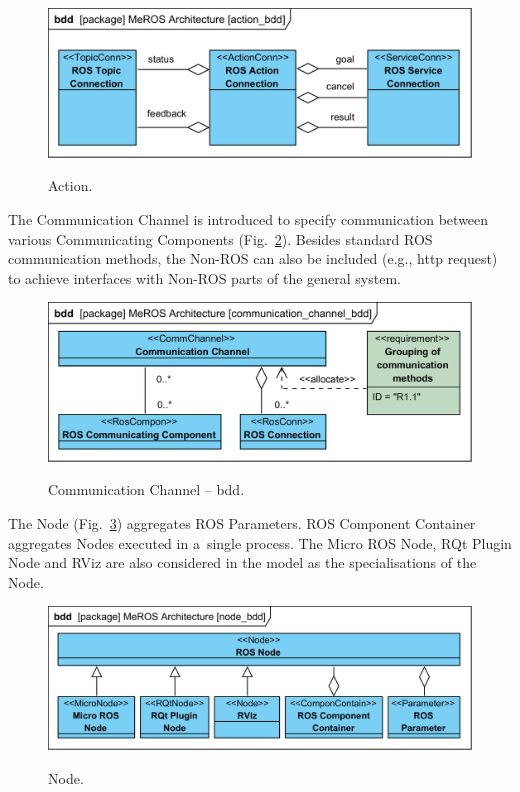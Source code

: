 \documentclass[11pt,oneside,a4paper]{report}
\begin{document}
	\begin{figure}[hbt]
		\centering
		\begin{center}
			{\includegraphics[scale=1.0]{diagrams/action_bdd.png}}
		\end{center}
		\caption{Action.} 
		\label{fig:action_bdd}
	\end{figure}
	
	\pagebreak
	
	The Communication Channel is introduced to specify communication between various Communicating Components (Fig.~\ref{fig:communication_channel_bdd}).
	Besides standard ROS communication methods, the Non-ROS can also be included (e.g., http request) to achieve interfaces with Non-ROS parts of the general system. 
	

	\begin{figure}[H]
		\centering
		\begin{center}
			{\includegraphics[scale=1.0]{diagrams/communication_channel_bdd.png}}
		\end{center}
		\caption{Communication Channel -- bdd.} 
		\label{fig:communication_channel_bdd}
	\end{figure}
	
		 
 	The Node (Fig.~\ref{fig:node_bdd}) aggregates ROS Parameters. ROS Component Container aggregates Nodes executed in a~single process. The Micro ROS Node, RQt Plugin Node and RViz are also considered in the model as the specialisations of the Node.
 	
	 
 	\begin{figure}[H]
	 	\centering
	 	\begin{center}
	 		{\includegraphics[scale=1.0]{diagrams/node_bdd.png}}
	 	\end{center}
	 	\caption{Node.} 
		 	\label{fig:node_bdd}
	 \end{figure}
	 
\end{document}
